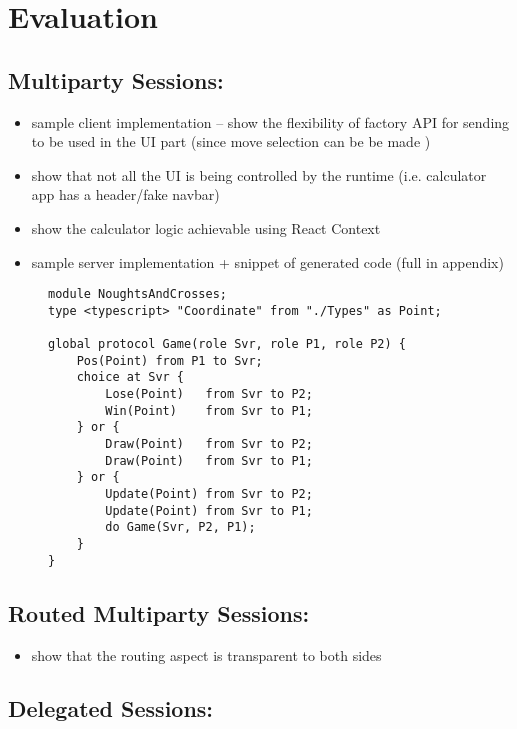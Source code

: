 \chapter{Evaluation}
\label{chap:eval}

\section{Multiparty Sessions: }
\label{section:evalgame}
\begin{itemize}
\item sample client implementation -- show the flexibility of factory API for sending to be used in the UI part (since move selection can be be made )
\item show that not all the UI is being controlled by the runtime (i.e. calculator app has a header/fake navbar)
\item show the calculator logic achievable using React Context
\item sample server implementation + snippet of generated code (full in appendix)
\end{itemize}

\begin{figure}[!ht]
\begin{lstlisting}[language=Scribble, tabsize=2]
module NoughtsAndCrosses;
type <typescript> "Coordinate" from "./Types" as Point;

global protocol Game(role Svr, role P1, role P2) {
	Pos(Point) from P1 to Svr;
	choice at Svr {
		Lose(Point)   from Svr to P2;
		Win(Point)    from Svr to P1;
	} or {
		Draw(Point)   from Svr to P2;
		Draw(Point)   from Svr to P1;
	} or {
		Update(Point) from Svr to P2;
		Update(Point) from Svr to P1;
		do Game(Svr, P2, P1);
	}
}
\end{lstlisting}
\label{lst:game}
\end{figure}

\section{Routed Multiparty Sessions: }
\begin{itemize}
\item show that the routing aspect is transparent to both sides
\end{itemize}

\section{Delegated Sessions: }
\label{section:evalatm}

